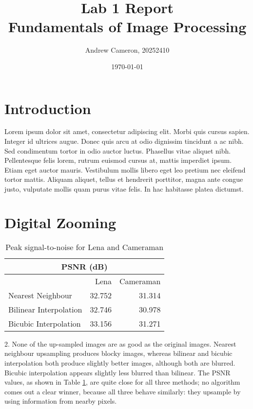 \documentclass{sydeStyle}
\title{Lab 1 Report\\
Fundamentals of Image Processing}
\date{\today}
\author{Andrew Cameron, 20252410}
\begin{document}
\maketitle

\section*{Introduction}
Lorem ipsum dolor sit amet, consectetur adipiscing elit. Morbi quis cursus
sapien. Integer id ultrices augue. Donec quis arcu at odio dignissim
tincidunt a ac nibh. Sed condimentum tortor in odio auctor luctus.
Phasellus vitae aliquet nibh. Pellentesque felis lorem, rutrum euismod
cursus at, mattis imperdiet ipsum. Etiam eget auctor mauris. Vestibulum
mollis libero eget leo pretium nec eleifend tortor mattis. Aliquam aliquet,
tellus et hendrerit porttitor, magna ante congue justo, vulputate mollis
quam purus vitae felis. In hac habitasse platea dictumst.

\section*{Digital Zooming}

\begin{table}
	\centering
	\begin{tabular}{| l | r | r |}
		\hline
		\multicolumn{3}{|c|}{PSNR (dB)} \\ \hline
		& Lena & Cameraman \\ \hline
		Nearest Neighbour & 32.752 & 31.314 \\ \hline
		Bilinear Interpolation & 32.746 & 30.978 \\ \hline
		Bicubic Interpolation & 33.156 & 31.271 \\
		\hline
	\end{tabular}
	\caption{Peak signal-to-noise for Lena and Cameraman}
	\label{tab:psnr}
\end{table}
2. None of the up-sampled images are as good as the original images.  Nearest
neighbour upsampling produces blocky images, whereas bilinear and
bicubic interpolation both produce slightly better images, although both are
blurred.  Bicubic interpolation appears slightly less blurred than bilinear.
The PSNR values, as shown in Table \ref{tab:psnr}, are quite close for all
three methods; no algorithm comes out a clear winner, because all three
behave similarly: they upsample by using information from nearby pixels.
\end{document}
